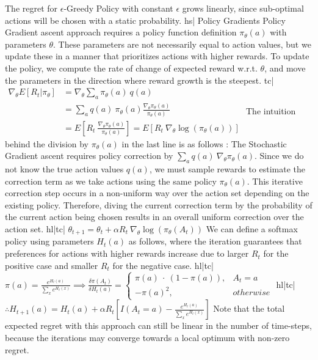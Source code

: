 The regret for \(\epsilon\)-Greedy Policy with constant \(\epsilon\) grows linearly, since sub-optimal actions will be chosen with a static probability.
hs| Policy Gradients
Policy Gradient ascent approach requires a policy function definition \(\pi_\theta(a)\) with parameters \(\theta\). These parameters are not necessarily equal to action values, but we update these in a manner that prioritizes actions with higher rewards. To update the policy, we compute the rate of change of expected reward w.r.t. \(\theta\), and move the parameters in the direction where reward growth is the steepest.
tc| \( \begin{aligned} \nabla_\theta E[R_t | \pi_\theta] &= \nabla_\theta \sum_a \pi_\theta(a) \ q(a) \\ &= \sum_a q(a) \ \pi_\theta(a) \frac{\nabla_\theta \pi_\theta(a)}{\pi_\theta(a)} \\ &= E\left[R_t \ \frac{\nabla_\theta \pi_\theta(a)}{\pi_\theta(a)} \right] = E\left[ R_t \ \nabla_\theta \log(\pi_\theta(a)) \right] \end{aligned} \)
The intuition behind the division by \(\pi_\theta(a)\) in the last line is as follows : The Stochastic Gradient ascent requires policy correction by \(\sum_a q(a) \ \nabla_\theta \pi_\theta(a) \). Since we do not know the true action values \(q(a)\), we must sample rewards to estimate the correction term as we take actions using the same policy \(\pi_\theta(a)\). This iterative correction step occurs in a non-uniform way over the action set depending on the existing policy. Therefore, diving the current correction term by the probability of the current action being chosen results in an overall uniform correction over the action set.
hl|tc| \( \theta_{t+1} = \theta_t + \alpha R_t \ \nabla_\theta \log(\pi_\theta(A_t)) \)
We can define a softmax policy using parameters \(H_t(a)\) as follows, where the iteration guarantees that preferences for actions with higher rewards increase due to larger \(R_t\) for the positive case and smaller \(R_t\) for the negative case.
hl|tc| \( \pi(a) = \frac{e^{H_t(a)}}{\sum_x e^{H_t(x)}} \implies \frac{\delta \pi(A_t)}{\delta H_t(a)} = \begin{cases} \pi(a) \ \cdot \ (1 - \pi(a)), & A_t=a \\ - \pi(a)^2, & otherwise \end{cases} \)
hl|tc| \( \therefore H_{t+1}(a) = H_t(a) + \alpha R_t \left[I(A_t=a) - \frac{e^{H_t(a)}}{\sum_x e^{H_t(x)}}\right] \)
Note that the total expected regret with this approach can still be linear in the number of time-steps, because the iterations may converge towards a local optimum with non-zero regret.
